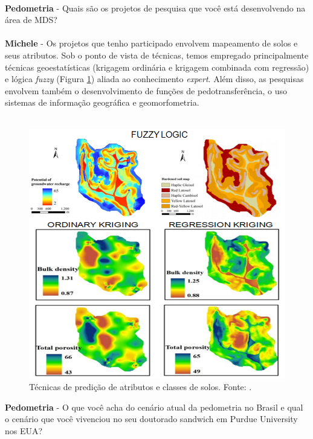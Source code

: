 \\
\textbf{Pedometria} - Quais são os projetos de pesquisa que você está desenvolvendo na área de MDS?\\
\\
\textbf{Michele} - Os projetos que tenho participado envolvem mapeamento de solos e seus atributos. Sob o ponto de vista de técnicas, temos empregado principalmente técnicas geoestatísticas (krigagem ordinária e krigagem combinada com regressão) e lógica \emph{fuzzy} (Figura \ref{fig:tecnicas}) aliada ao conhecimento \emph{expert}. Além disso, as pesquisas envolvem também o desenvolvimento de funções de pedotransferência, o uso sistemas de informação geográfica e geomorfometria.\\
\\
\begin{figure}[htbp]
\centering
\includegraphics[scale=0.8]{figuras/tecnicas-predicao}
\caption{Técnicas de predição de atributos e classes de solos. Fonte: \cite{Menezes:2011}.}
\label{fig:tecnicas}
\end{figure}
\noindent \textbf{Pedometria} - O que você acha do cenário atual da pedometria no Brasil e qual o cenário que você vivenciou no seu doutorado sandwich em Purdue University nos EUA?\\
\\
